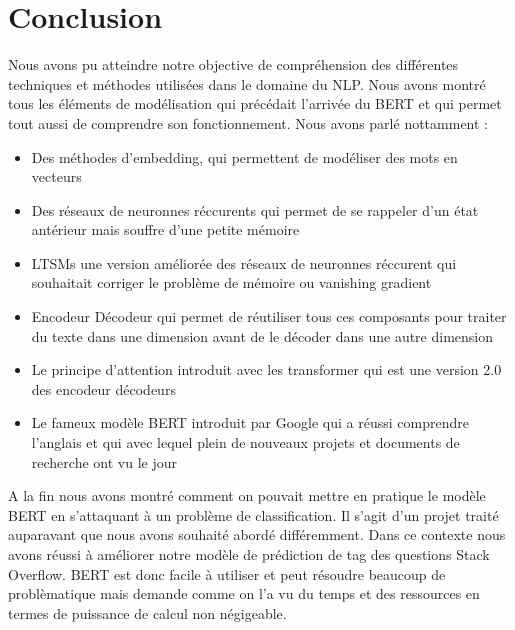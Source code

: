 \documentclass[8pt]{article}
\begin{document}
    \hypertarget{conclusion}{%
\section{Conclusion}\label{conclusion}}

    Nous avons pu atteindre notre objective de compréhension des différentes
techniques et méthodes utilisées dans le domaine du NLP. Nous avons
montré tous les éléments de modélisation qui précédait l'arrivée du BERT
et qui permet tout aussi de comprendre son fonctionnement. Nous avons
parlé nottamment : 
\begin{itemize}
\item Des méthodes d'embedding, qui permettent de modéliser
des mots en vecteurs
 \item  Des réseaux de neuronnes réccurents qui permet de
se rappeler d'un état antérieur mais souffre d'une petite mémoire 
\item  LTSMs une version améliorée des réseaux de neuronnes réccurent qui
souhaitait corriger le problème de mémoire ou vanishing gradient 
\item Encodeur Décodeur qui permet de réutiliser tous ces composants pour
traiter du texte dans une dimension avant de le décoder dans une autre
dimension 
\item  Le principe d'attention introduit avec les transformer qui
est une version 2.0 des encodeur décodeurs 
\item  Le fameux modèle BERT
introduit par Google qui a réussi comprendre l'anglais et qui avec
lequel plein de nouveaux projets et documents de recherche ont vu le
jour
\end{itemize}

A la fin nous avons montré comment on pouvait mettre en pratique le
modèle BERT en s'attaquant à un problème de classification. Il s'agit
d'un projet traité auparavant que nous avons souhaité abordé
différemment. Dans ce contexte nous avons réussi à améliorer notre
modèle de prédiction de tag des questions Stack Overflow. BERT est donc
facile à utiliser et peut résoudre beaucoup de problèmatique mais
demande comme on l'a vu du temps et des ressources en termes de
puissance de calcul non négigeable.


    
    
    
\end{document}
